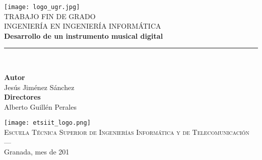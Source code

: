 
\begin{titlepage}

    \newlength{\centeroffset}
    \setlength{\centeroffset}{-0.5\oddsidemargin}
    \addtolength{\centeroffset}{0.5\evensidemargin}
    \thispagestyle{empty}

    \noindent\hspace*{\centeroffset}

    \begin{minipage}{\textwidth}

        \centering
        \texttt{[image: logo\_ugr.jpg]}\\[1.4cm]

        \textsc{ \Large TRABAJO FIN DE GRADO\\[0.2cm]}
        \textsc{ INGENIERÍA EN INGENIERÍA INFORMÁTICA}\\[1cm]
        {\Huge\bfseries Desarrollo de un instrumento musical digital\\
        }
        \noindent\rule[-1ex]{\textwidth}{3pt}\\[3.5ex]

    \end{minipage}

    \vspace{2.5cm}
    \noindent\hspace*{\centeroffset}

    \begin{minipage}{\textwidth}

        \centering

        \textbf{Autor}\\
        { Jesús Jiménez Sánchez }\\
        [2.5ex]
        \textbf{Directores}\\
        { Alberto Guillén Perales\\
        [2cm] }

        \texttt{[image: etsiit\_logo.png]}\\[0.1cm]
        \textsc{Escuela Técnica Superior de Ingenierías Informática y de Telecomunicación}\\
        \textsc{---}\\
        Granada, mes de 201

    \end{minipage}

\end{titlepage}

